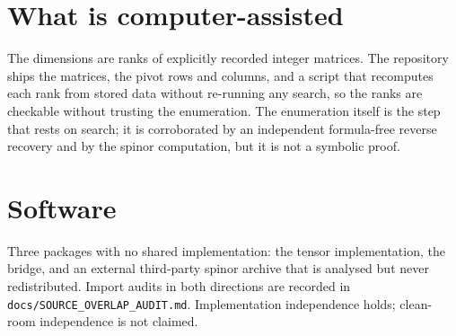 \documentclass[aps,prl,onecolumn,superscriptaddress,nofootinbib]{revtex4-2}
\begin{document}
\section{What is computer-assisted}
The dimensions are ranks of explicitly recorded integer matrices. The repository
ships the matrices, the pivot rows and columns, and a script that recomputes each
rank from stored data without re-running any search, so the ranks are checkable
without trusting the enumeration. The enumeration itself is the step that rests
on search; it is corroborated by an independent formula-free reverse recovery and
by the spinor computation, but it is not a symbolic proof.

\section{Software}
Three packages with no shared implementation: the tensor implementation, the
bridge, and an external third-party spinor archive that is analysed but never
redistributed. Import audits in both directions are recorded in
\texttt{docs/SOURCE\_OVERLAP\_AUDIT.md}. Implementation independence holds;
clean-room independence is not claimed.
\end{document}

